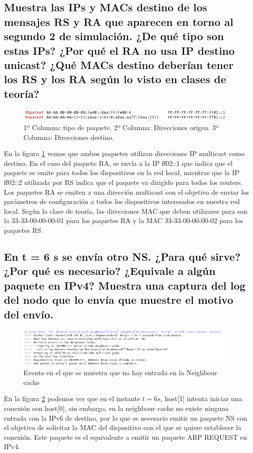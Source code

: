 \subsection{Muestra las IPs y MACs destino de los mensajes RS y RA que aparecen en torno al segundo 2 de simulación. ¿De qué tipo son estas IPs? ¿Por qué el RA no usa IP destino unicast? ¿Qué MACs destino deberían tener los RS y los RA según lo visto en clases de teoría?}
\begin{flushleft}
    \begin{figure}[h]
    \centering
    \includegraphics[width=\textwidth]{img/ej9.1.png}
    \caption{1º Columna: tipo de paquete. 2º Columna: Direcciones origen. 3º Columna: Direcciones destino.}
    \label{fig:ej9.1}
\end{figure}

En la figura \ref{fig:ej9.1} vemos que ambos paquetes utilizan direcciones IP multicast como destino. En el caso del paquete RA, se envía a la IP ff02::1 que indica que el paquete se emite para todos los dispositivos en la red local, mientras que la IP ff02::2 utilizada por RS indica que el paquete va dirigido para todos los routers. Los paquetes RA se emiten a una dirección multicast con el objetivo de enviar los parámetros de configuración a todos los dispositivos interesados en nuestra red local. Según la clase de teoría, las direcciones MAC que deben utilizarse para son la 33-33-00-00-00-01 para los paquetes RA y la MAC 33-33-00-00-00-02 para los paquetes RS. 

\end{flushleft}

\subsection{En t = 6 s se envía otro NS. ¿Para qué sirve? ¿Por qué es necesario? ¿Equivale a algún paquete en IPv4? Muestra una captura del log del nodo que lo envía que muestre el motivo del envío.}
\begin{flushleft}
    \begin{figure}[h]
    \centering
    \includegraphics[width=\textwidth]{img/ej10.1.png}
    \caption{Evento en el que se muestra que no hay entrada en la Neighbour cache}
    \label{fig:ej10.1}
\end{figure}

En la figura \ref{fig:ej10.1} podemos ver que en el instante \(t = 6s\), host[1] intenta iniciar una conexión con host[0], sin embargo, en la neighbour cache no existe ninguna entrada con la IPv6 de destino, por lo que es necesario emitir un paquete NS con el objetivo de solicitar la MAC del dispositivo con el que se quiere establecer la conexión. Este paquete es el equivalente a emitir un paquete ARP REQUEST en IPv4.
\end{flushleft}

